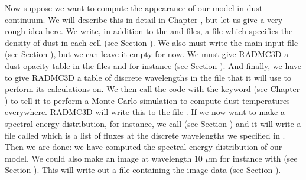 \documentclass[letterpaper,10pt,english]{sphinxmanual}
\begin{document}
Now suppose we want to compute the appearance of our model in dust continuum. We
will describe this in detail in Chapter {\hyperref[\detokenize{dustradtrans:chap-dust-transfer}]{}}, but let us
give a very rough idea here. We write, in addition to the  and
 files, a file  which specifies the density of
dust in each cell (see Section {\hyperref[\detokenize{inputoutputfiles:sec-dustdens}]{}}).  We also must write the
main input file  (see Section {\hyperref[\detokenize{inputoutputfiles:sec-radmc-inp}]{}}), but we can
leave it empty for now. We must give RADMC\sphinxhyphen{}3D a dust opacity table in the files
 and for instance  (see Section
{\hyperref[\detokenize{inputoutputfiles:sec-opacities}]{}}). And finally, we have to give RADMC\sphinxhyphen{}3D a table of discrete
wavelengths in the file  that it will use to perform
its calculations on. We then call the  code with the keyword
 (see Chapter {\hyperref[\detokenize{dustradtrans:chap-dust-transfer}]{}}) to tell it to perform a
Monte Carlo simulation to compute dust temperatures everywhere. RADMC\sphinxhyphen{}3D will
write this to the file . If we now want to make a
spectral energy distribution, for instance, we call  (see Section
{\hyperref[\detokenize{imagesspectra:sec-making-spectra}]{}}) and it will write a file called 
which is a list of fluxes at the discrete wavelengths we specified in
.  Then we are done: we have computed the spectral
energy distribution of our model. We could also make an image at wavelength 10
\(\mu\)m for instance with  (see Section
{\hyperref[\detokenize{imagesspectra:sec-images}]{}}). This will write out a file  containing the
image data (see Section {\hyperref[\detokenize{inputoutputfiles:sec-image-out}]{}}).
\end{document}

